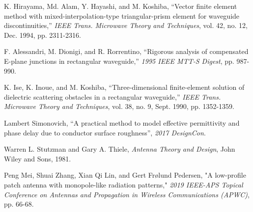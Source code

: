 \documentclass[titlepage]{article}
\renewcommand\_{\textunderscore\linebreak[1]}
\begin{document}
\begin{thebibliography}{unsrt}
 K. Hirayama, Md. Alam, Y. Hayashi, and M. Koshiba, “Vector finite element method with mixed-interpolation-type triangular-prism element for waveguide discontinuities,” \textit{IEEE Trans. Microwave Theory and Techniques}, vol. 42, no. 12, Dec. 1994, pp. 2311-2316.

 F. Alessandri, M. Dionigi, and R. Rorrentino, “Rigorous analysis of compensated E-plane junctions in rectangular waveguide,” \textit{1995 IEEE MTT-S Digest}, pp. 987-990.

 K. Ise, K. Inoue, and M. Koshiba, “Three-dimensional finite-element solution of dielectric scattering obstacles in a rectangular waveguide,” \textit{IEEE Trans. Microwave Theory and Techniques}, vol. 38, no. 9, Sept. 1990, pp. 1352-1359.

 Lambert Simonovich, “A practical method to model effective permittivity and phase delay due to conductor surface roughness”, \textit{2017 DesignCon}.

 Warren L. Stutzman and Gary A. Thiele, \textit{Antenna Theory and Design}, John Wiley and Sons, 1981.

 Peng Mei, Shuai Zhang, Xian Qi Lin, and Gert Fr\o lund Pedersen, "A low-profile patch antenna with monopole-like radiation patterns," \textit{2019 IEEE-APS Topical Conference on Antennas and Propagation in Wireless Communications (APWC)}, pp. 66-68.

\end{thebibliography}
\end{document}

